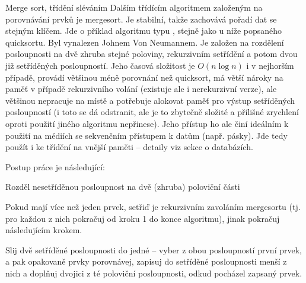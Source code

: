 \begin{algoritmusN}{Merge sort, třídění sléváním}
Dalším třídícím algoritmem založeným na porovnávání prvků je mergesort. Je stabilní, takže zachovává pořadí dat se stejným klíčem. Jde o příklad algoritmu typu , stejně jako u níže popsaného quicksortu. Byl vynalezen Johnem Von Neumannem. Je založen na rozdělení posloupnosti na dvě zhruba stejné poloviny, rekurzivním setřídění a potom  dvou již setříděných posloupností. Jeho časová složitost je $O(n\log n)$ i v nejhorším případě, provádí většinou méně porovnání než quicksort, má větší nároky na paměť v případě rekurzivního volání (existuje ale i nerekurzivní verze), ale většinou nepracuje na místě a potřebuje alokovat paměť pro výstup setříděných posloupností (i toto se dá odstranit, ale je to zbytečně složité a přílišné zrychlení oproti použití jiného algoritmu nepřinese). Jeho přístup ho ale činí ideálním k použití na médiích se sekvenčním přístupem k datům (např. pásky). Jde tedy použít i ke třídění na vnější paměti -- detaily viz sekce o databázích.

Postup práce je následující:
\begin{penumerate}
    \item Rozděl nesetříděnou posloupnost na dvě (zhruba) poloviční části    
    \item Pokud mají více než jeden prvek, setřiď je rekurzivním zavoláním mergesortu (tj. pro každou z nich pokračuj od kroku 1 do konce algoritmu), jinak pokračuj následujícím krokem.
    \item Slij dvě setříděné posloupnosti do jedné -- vyber z obou posloupností první prvek, a pak opakovaně prvky porovnávej, zapisuj do setříděné posloupnosti menší z nich a doplňuj dvojici z té poloviční posloupnosti, odkud pocházel zapsaný prvek.
\end{penumerate}
\end{algoritmusN}

